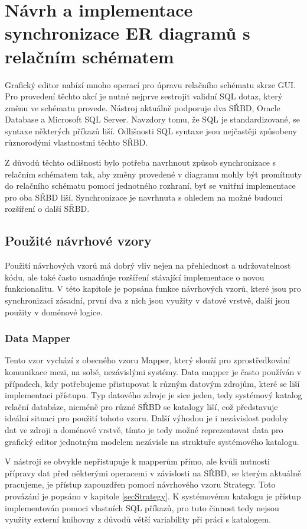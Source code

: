 \documentclass[czech,bachelor,public,dept460,male,oneside]{diploma}
\begin{document}
\newpage
\section{Návrh a implementace synchronizace ER diagramů s relačním schématem}
Grafický editor nabízí mnoho operací pro úpravu relačního schématu skrze GUI. Pro provedení těchto akcí je nutné nejprve sestrojit validní SQL dotaz, který změnu ve schématu provede. Nástroj aktuálně podporuje dva SŘBD, Oracle Database a Microsoft SQL Server. Navzdory tomu, že SQL je standardizované, se syntaxe některých příkazů liší. Odlišnosti SQL syntaxe jsou nejčastěji způsobeny různorodými vlastnostmi těchto SŘBD. 

Z důvodů těchto odlišnosti bylo potřeba navrhnout způsob synchronizace s relačním schématem tak, aby změny provedené v diagramu mohly být promítnuty do relačního schématu pomocí jednotného rozhraní, byť se vnitřní implementace pro oba SŘBD liší. Synchronizace je navrhnuta s ohledem na možné budoucí rozšíření o další SŘBD.
	
	\subsection{Použité návrhové vzory}
	Použití návrhových vzorů má dobrý vliv nejen na přehlednost a udržovatelnost kódu, ale také často usnadňuje rozšíření stávající implementace o novou funkcionalitu.  V této kapitole je popsána funkce návrhových vzorů, které jsou pro synchronizaci zásadní, první dva z nich jsou využity v datové vrstvě, další jsou použity v doménové logice.
	
		\subsubsection{Data Mapper}
		Tento vzor vychází z obecného vzoru Mapper, který slouží pro zprostředkování komunikace mezi, na sobě, nezávislými systémy. Data mapper je často používán v případech, kdy potřebujeme přistupovat k různým datovým zdrojům, které se liší implementaci přístupu. Typ datového zdroje je sice jeden, tedy systémový katalog relační databáze, nicméně pro různé SŘBD se katalogy liší, což představuje ideální situaci pro použití tohoto vzoru. Další výhodou je i nezávislost podoby dat ve zdroji a doménové vrstvě, tímto je tedy možné reprezentovat data pro grafický editor jednotným modelem nezávisle na struktuře systémového katalogu.
		
		V nástroji se obvykle nepřistupuje k mapperům přímo, ale kvůli nutnosti přípravy dat před některými operacemi v závislosti na SŘBD, se kterým aktuálně pracujeme, je přístup zapouzdřen pomocí návrhového vzoru Strategy. Toto provázání je popsáno v kapitole \ref{secStrategy}. K systémovému katalogu je přístup implementován pomoci vlastních SQL příkazů, pro tuto činnost tedy nejsou využity externí knihovny z důvodů větší variability při práci s katalogem.
		
\end{document}

